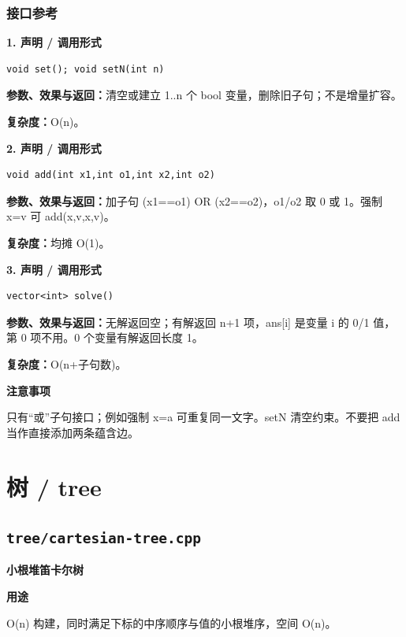 \documentclass[UTF8,a4paper,10pt]{ctexart}
\newcommand{\TemplUsage}[1]{\textbf{用途}\par #1\par}
\newcommand{\TemplNote}[1]{\textbf{注意事项}\par #1\par}
\begin{document}
\subsubsection*{接口参考}
\noindent\begin{minipage}{\textwidth}
\textbf{1. 声明 / 调用形式}
\begin{lstlisting}
void set(); void setN(int n)
\end{lstlisting}
\textbf{参数、效果与返回：}清空或建立 1..n 个 bool 变量，删除旧子句；不是增量扩容。

\textbf{复杂度：}O(n)。

\end{minipage}\par\vspace{0.4em}
\noindent\begin{minipage}{\textwidth}
\textbf{2. 声明 / 调用形式}
\begin{lstlisting}
void add(int x1,int o1,int x2,int o2)
\end{lstlisting}
\textbf{参数、效果与返回：}加子句 (x1==o1) OR (x2==o2)，o1/o2 取 0 或 1。强制 x=v 可 add(x,v,x,v)。

\textbf{复杂度：}均摊 O(1)。

\end{minipage}\par\vspace{0.4em}
\noindent\begin{minipage}{\textwidth}
\textbf{3. 声明 / 调用形式}
\begin{lstlisting}
vector<int> solve()
\end{lstlisting}
\textbf{参数、效果与返回：}无解返回空；有解返回 n+1 项，ans[i] 是变量 i 的 0/1 值，第 0 项不用。0 个变量有解返回长度 1。

\textbf{复杂度：}O(n+子句数)。

\TemplNote{只有“或”子句接口；例如强制 x=a 可重复同一文字。setN 清空约束。不要把 add 当作直接添加两条蕴含边。}
\end{minipage}\par\vspace{0.4em}
\clearpage
\section{树 / tree}
\subsection{\texttt{tree/cartesian-tree.cpp}}
\textbf{小根堆笛卡尔树}\par
\TemplUsage{O(n) 构建，同时满足下标的中序顺序与值的小根堆序，空间 O(n)。}
\end{document}
